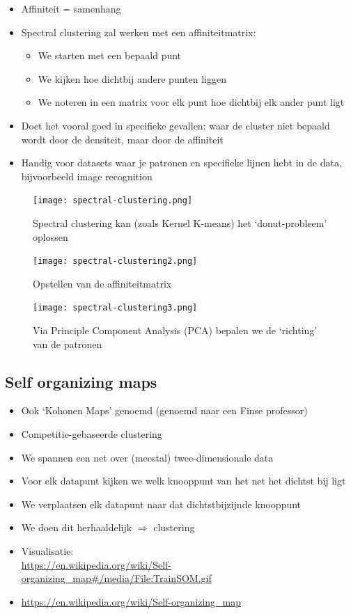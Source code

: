 \documentclass{article}
\begin{document}
\begin{itemize}
    \item Affiniteit = samenhang
    \item Spectral clustering zal werken met een affiniteitmatrix:
    \begin{itemize}
        \item We starten met een bepaald punt
        \item We kijken hoe dichtbij andere punten liggen
        \item We noteren in een matrix voor elk punt hoe dichtbij elk ander punt ligt
    \end{itemize}
    \item Doet het vooral goed in specifieke gevallen: waar de cluster niet bepaald wordt door de densiteit, maar door de affiniteit
    \item Handig voor datasets waar je patronen en specifieke lijnen hebt in de data, bijvoorbeeld image recognition
\end{itemize}

\begin{figure}[H]
    \centering
    \texttt{[image: spectral-clustering.png]}
    \caption{Spectral clustering kan (zoals Kernel K-means) het `donut-probleem' oplossen}
\end{figure}

\begin{figure}[H]
    \centering
    \texttt{[image: spectral-clustering2.png]}
    \caption{Opstellen van de affiniteitmatrix}
\end{figure}

\begin{figure}[H]
    \centering
    \texttt{[image: spectral-clustering3.png]}
    \caption{Via Principle Component Analysis (PCA) bepalen we de `richting' van de patronen}
\end{figure}

\subsection{Self organizing maps}

\begin{itemize}
    \item Ook `Kohonen Maps' genoemd (genoemd naar een Finse professor)
    \item Competitie-gebaseerde clustering
    \item We spannen een net over (meestal) twee-dimensionale data
    \item Voor elk datapunt kijken we welk knooppunt van het net het dichtst bij ligt
    \item We verplaatsen elk datapunt naar dat dichtstbijzijnde knooppunt 
    \item We doen dit herhaaldelijk $\Rightarrow$ clustering
    \item Visualisatie: \\ \url{https://en.wikipedia.org/wiki/Self-organizing_map#/media/File:TrainSOM.gif}
    \item \url{https://en.wikipedia.org/wiki/Self-organizing_map}
\end{itemize}
\end{document}
